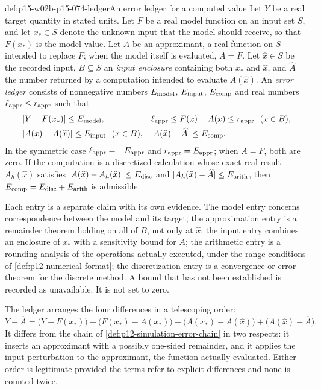 \begin{hbdefinition}{def:p15-w02b-p15-074-ledger}{An error ledger for a computed value}
Let \(Y\) be a real target quantity in stated units. Let \(F\) be a real
model function on an input set \(S\), and let \(x_*\in S\) denote the
unknown input that the model should receive, so that \(F(x_*)\) is the
model value. Let \(A\) be an approximant, a real function on \(S\) intended
to replace \(F\); when the model itself is evaluated, \(A=F\). Let
\(\widehat x\in S\) be the recorded input, \(B\subseteq S\) an
\emph{input enclosure} containing both \(x_*\) and \(\widehat x\), and
\(\widehat A\) the number returned by a computation intended to evaluate
\(A(\widehat x)\). An \emph{error ledger} consists of nonnegative numbers
\(E_{\rm model}\), \(E_{\rm input}\), \(E_{\rm comp}\) and real numbers
\(\ell_{\rm appr}\leq r_{\rm appr}\) such that
\[
\begin{aligned}
 &|Y-F(x_*)|\leq E_{\rm model},&&
 \ell_{\rm appr}\leq F(x)-A(x)\leq r_{\rm appr}\ \ (x\in B),\\
 &|A(x)-A(\widehat x)|\leq E_{\rm input}\ \ (x\in B),&&
 |A(\widehat x)-\widehat A|\leq E_{\rm comp}.
\end{aligned}
\]
In the symmetric case \(\ell_{\rm appr}=-E_{\rm appr}\) and
\(r_{\rm appr}=E_{\rm appr}\); when \(A=F\), both are zero. If the
computation is a discretized calculation whose exact-real result
\(A_h(\widehat x)\) satisfies \(|A(\widehat x)-A_h(\widehat x)|\leq
E_{\rm disc}\) and \(|A_h(\widehat x)-\widehat A|\leq E_{\rm arith}\),
then \(E_{\rm comp}=E_{\rm disc}+E_{\rm arith}\) is admissible.

Each entry is a separate claim with its own evidence. The model entry
concerns correspondence between the model and its target; the
approximation entry is a remainder theorem holding on all of \(B\), not
only at \(\widehat x\); the input entry combines an enclosure of \(x_*\)
with a sensitivity bound for \(A\); the arithmetic entry is a rounding
analysis of the operations actually executed, under the range conditions
of \cref{def:p12-numerical-format}; the discretization entry is a
convergence or error theorem for the discrete method. A bound that has not
been established is recorded as unavailable. It is not set to zero.
\end{hbdefinition}

The ledger arranges the four differences in a telescoping order:
\[
 Y-\widehat A=\bigl(Y-F(x_*)\bigr)+\bigl(F(x_*)-A(x_*)\bigr)
 +\bigl(A(x_*)-A(\widehat x)\bigr)+\bigl(A(\widehat x)-\widehat A\bigr).
\]
It differs from the chain of \cref{def:p12-simulation-error-chain} in two
respects: it inserts an approximant with a possibly one-sided remainder,
and it applies the input perturbation to the approximant, the function
actually evaluated. Either order is legitimate provided the terms refer to
explicit differences and none is counted twice.


